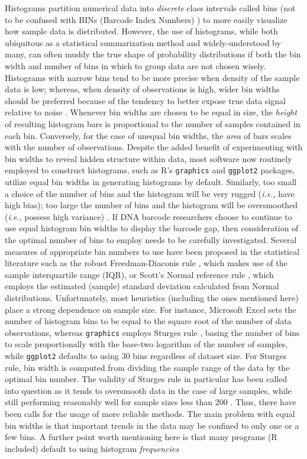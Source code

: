 Histograms partition numerical data into \textit{discrete} class intervals called bins (not to be confused with BINs (Barcode Index Numbers) \cite{ratnasingham2013dna}) to more easily visualize how sample data is distributed. However, the use of histograms, while both ubiquitous as a statistical summarization method and widely-understood by many, can often muddy the true shape of probability distributions if both the bin width and number of bins in which to group data are not chosen wisely. Histograms with narrow bins tend to be more precise when density of the sample data is low; whereas, when density of observations is high, wider bin widths should be preferred because of the tendency to better expose true data signal relative to noise \cite{scott1979optimal}. Whenever bin widths are chosen to be equal in size, the \textit{height} of resulting histogram bars is proportional to the number of samples contained in each bin. Conversely, for the case of unequal bin widths, the \textit{area} of bars scales with the number of observations. Despite the added benefit of experimenting with bin widths to reveal hidden structure within data, most software now routinely employed to construct histograms, such as R's {\tt graphics} \cite{r2018language} and {\tt ggplot2} packages, utilize equal bin widths in generating histograms by default. Similarly, too small a choice of the number of bins and the histogram will be very rugged (\textit{i.e.}, have high bias); too large the number of bins and the histogram will be oversmoothed (\textit{i.e.}, possess high variance) \cite{scott1979optimal}. If DNA barcode researchers choose to continue to use equal histogram bin widths to display the barcode gap, then consideration of the optimal number of bins to employ needs to be carefully investigated. Several measures of appropriate bin numbers to use have been proposed in the statistical literature such as the robust Freedman-Diaconis rule \cite{freedman1981on}, which makes use of the sample interquartile range (IQR), or Scott's Normal reference rule \cite{scott1979optimal}, which employs the estimated (sample) standard deviation calculated from Normal distributions. Unfortunately, most heuristics (including the ones mentioned here) place a strong dependence on sample size. For instance, Microsoft{\textregistered} Excel sets the number of histogram bins to be equal to the square root of the number of data observations, whereas {\tt graphics} employs Sturges rule \cite{sturges1926choice}, basing the number of bins to scale proportionally with the base-two logarithm of the number of samples, while {\tt ggplot2} defaults to using 30 bins regardless of dataset size. For Sturges rule, bin width is computed from dividing the sample range of the data by the optimal bin number. The validity of Sturges rule in particular has been called into question as it tends to oversmooth data in the case of large samples, while still performing reasonably well for sample sizes less than 200 \cite{hyndman1995problem}. Thus, there have been calls for the usage of more reliable methods. The main problem with equal bin widths is that important trends in the data may be confined to only one or a few bins. A further point worth mentioning here is that many programs (R included) default to using histogram \textit{frequencies} 